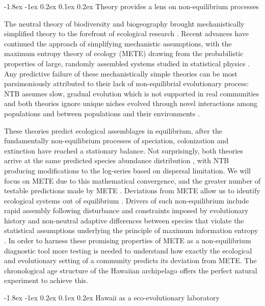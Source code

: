 \documentclass[11pt]{article}
\makeatletter
\renewcommand\subsection{\@startsection{subsection}{1}{\z@}%
                                  {-1.8ex \@plus -1ex \@minus 0.2ex}%
                                  {0.1ex \@plus 0.2ex}%
                                  {\normalfont\large\bfseries}}
\makeatother
\begin{document}
\subsection{Theory provides a lens on non-equilibrium processes}

The neutral theory of biodiversity and biogeography \citep[NTB;][]{hubbell2001} brought mechanistically simplified theory to the forefront of ecological research \citep{chave, rosindell}.  Recent advances have continued the approach of simplifying mechanistic assumptions, with the maximum entropy theory of ecology (METE) drawing from the probabilistic properties of large, randomly assembled systems studied in statistical physics \citep{harte2011}.  Any predictive failure of these mechanistically simple theories can be most parsimoniously attributed to their lack of non-equilibrial evolutionary process: NTB assumes slow, gradual evolution which is not supported in real communities \citep{ricklefsNeutral} and both theories ignore unique niches evolved through novel interactions among populations and between populations and their environments \citep{XXX}.

These theories predict ecological assemblages in equilibrium, after the fundamentally non-equilibrium processes of speciation, colonization and extinction have reached a stationary balance.  Not surprisingly, both theories arrive at the same predicted species abundance distribution \citep[Fisher’s log-series, long established as a null or neutral model;][]{fisher}, with NTB producing modifications to the log-series based on dispersal limitation.  We will focus on METE due to this mathematical convergence, and the greater number of testable predictions made by METE \citep{harte2011}.  Deviations from METE allow us to identify ecological systems out of equilibrium \citep{harte2011, rominger2015}.  Drivers of such non-equilibrium include rapid assembly following disturbance \citep{harte2011} and constraints imposed by evolutionary history and non-neutral adaptive differences between species that violate the statistical assumptions underlying the principle of maximum information entropy \citep{rominger2015}.  In order to harness these promising properties of METE as a non-equilibrium diagnostic tool more testing is needed to understand how exactly the ecological and evolutionary setting of a community predicts its deviation from METE.  The chronological age structure of the Hawaiian archipelago offers the perfect natural experiment to achieve this.


\subsection{Hawaii as a eco-evolutionary laboratory}
\end{document}
